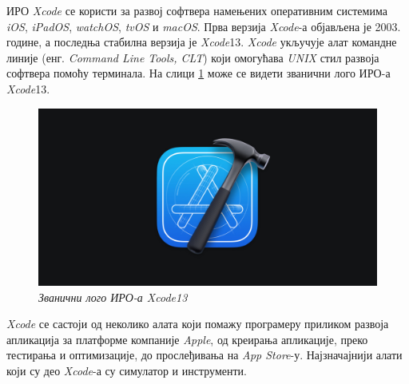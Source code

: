 \documentclass[12pt,oneside]{memoir}
\begin{document}
\indent ИРО \textit{Xcode} се користи за развој софтвера намењених оперативним системима \textit{iOS}, \textit{iPadOS}, \textit{watchOS}, \textit{tvOS} и \textit{macOS}. Прва верзија \textit{Xcode}-а објављена је 2003. године, а последња стабилна верзија је \textit{Xcode}13. \textit{Xcode} укључује алат командне линије (енг. \textit{Command Line Tools, CLT}) који омогућава \textit{UNIX} стил развоја софтвера помоћу терминала. На слици \ref{slika:xcode13_logo} може се видети званични лого ИРО-а \textit{Xcode}13.

\begin{figure}[H]
\includegraphics[width=1\textwidth]{images/Xcode_logo.jpg}
\centering
\caption{\textit{Званични лого ИРО-а Xcode13}}
\label{slika:xcode13_logo}
\end{figure}

\indent \textit{Xcode} се састоји од неколико алата који помажу програмеру приликом развоја апликација за платформе компаније \textit{Apple}, од креирања апликације, преко тестирања и оптимизације, до прослеђивања на \textit{App Store}-у. Најзначајнији алати који су део \textit{Xcode}-а су симулатор и инструменти.
\end{document}
